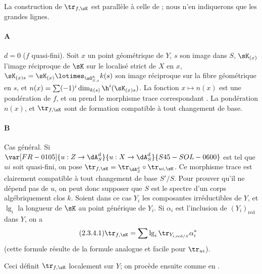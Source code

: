 \subsubsection{}\label{IV:2-3-4}

La construction de $\tr_{f,\sK}$ est parallèle à celle de 
; nous n'en indiquerons que les grandes lignes.

\paragraph{A}
$d=0$ ($f$ quasi-fini). Soit $x$ un point géométrique de $Y$, $s$ son image 
dans $S$, $\sK_{(x)}$ l'image réciproque de $\sK$ sur le localisé strict 
de $X$ en $x$, $\sK_{(x)s} = \sK_{(x)}\lotimes_{\sO_{S,s}^h} k(s)$ son image 
réciproque sur la fibre géométrique en $s$, et 
$n(x)=\sum (-1)^i \dim_{k(s)} \h^i(\sK_{(x)s})$. La fonction $x\mapsto n(x)$ 
est une pondération de $f$, et on prend le morphisme trace correspondant 
. La pondération $n(x)$, et $\tr_{f,\sK}$ sont de 
formation compatible à tout changement de base. 

\paragraph{B}
Cas général. Si $\var[FR-0105]{u:Z\to \dA_S^d}{u:X\to \dA_S^d}{S45-SOL-0600}$ est tel que $u i$ soit quasi-fini, on pose 
$\tr_{f,\sK} = \tr_{\dA_S^d}\circ \tr_{u i,\sK}$. Ce morphisme trace est 
clairement compatible à tout changement de base $S'/S$. Pour prouver qu'il ne 
dépend pas de $u$, on peut donc supposer que $S$ est le spectre d'un corps 
algébriquement clos $k$. Soient dans ce cas $Y_i$ les composantes 
irréductibles de $Y$, et $\operatorname{lg}_i$ la longueur de $\sK$ au 
point générique de $Y_i$. Si $\alpha_i$ est l'inclusion de 
$(Y_i)_\text{red}$ dans $Y$, on a 
\begin{equation*}\tag{2.3.4.1}\label{IV:eq:2-3-4}
  \tr_{f,\sK} = \sum \operatorname{lg}_i \tr_{Y_{i,\text{red}/S}} \alpha_i^\ast
\end{equation*}
(cette formule résulte de la formule analogue et facile pour $\tr_{u i}$). 

Ceci définit $\tr_{f,\sK}$ localement sur $Y$; on procède ensuite comme en 
. 





